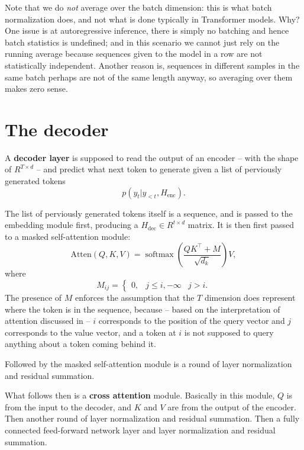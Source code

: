 \documentclass[hyperref, a4paper, 12pt]{report}
\DeclareMathOperator{\softmax}{softmax}
\newcommand*{\concept}[1]{{\textbf{#1}}}
\def\\{}%
\def\mathbb#1{#1}%
\begin{document}
Note that we do \emph{not} average over the batch dimension:
this is what batch normalization does, and not what is done typically in Transformer models.
Why? One issue is at autoregressive inference, there is simply no batching and hence batch statistics is undefined;
and in this scenario we cannot just rely on the running average
because sequences given to the model in a row are not statistically independent.
Another reason is, sequences in different samples in the same batch perhaps are not of the same length anyway,
so averaging over them makes zero sense.

\section{The decoder}

A \concept{decoder layer} is supposed to read the output of an encoder -- 
with the shape of $\mathbb{R}^{T \times d}$ -- 
and predict what next token to generate given a list of perviously generated tokens
\begin{equation}
    p(y_t | y_{<t}, H_{\text{enc}}).
\end{equation}

The list of perviously generated tokens itself is a sequence,
and is passed to the embedding module first, producing a $H_{\text{dec}} \in \mathbb{R}^{t \times d}$ matrix.
It is then first passed to a masked self-attention module:
\begin{equation}
    \mathrm{Atten}(Q, K, V) = \softmax \left( \frac{Q K^\top + M}{\sqrt{d_k}} \right) V,
\end{equation}
where 
\begin{equation}
    M_{ij} = \begin{cases}
        0, & j \leq i , \\
        -\infty & j > i.
    \end{cases}
\end{equation}
The presence of $M$ enforces the assumption that the $T$ dimension does represent where the token is in the sequence,
because -- based on the interpretation of attention discussed in  -- $i$ corresponds to the position of the query vector and $j$ corresponds to the value vector,
and a token at $i$ is not supposed to query anything about a token coming behind it.

Followed by the masked self-attention module is a round of layer normalization and residual summation.

What follows then is a \concept{cross attention} module.
Basically in this module, $Q$ is from the input to the decoder, and $K$ and $V$ are from the output of the encoder.
Then another round of layer normalization and residual summation.
Then a fully connected feed-forward network layer and layer normalization and residual summation.
\end{document}
